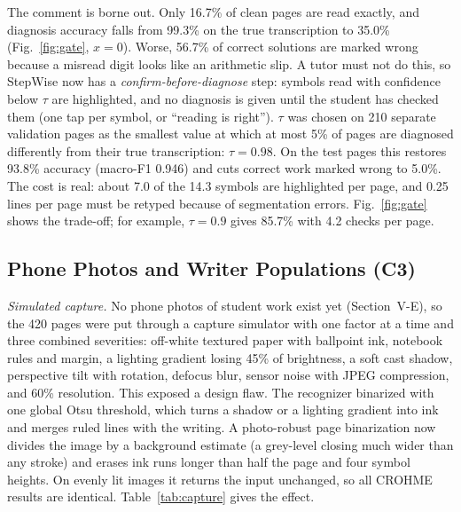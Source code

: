 \documentclass[conference]{IEEEtran}
\begin{document}
The comment is borne out. Only 16.7\% of clean pages are read exactly, and diagnosis accuracy falls from 99.3\% on the true transcription to 35.0\% (Fig.~\ref{fig:gate}, $x=0$). Worse, 56.7\% of correct solutions are marked wrong because a misread digit looks like an arithmetic slip. A tutor must not do this, so StepWise now has a \textit{confirm-before-diagnose} step: symbols read with confidence below $\tau$ are highlighted, and no diagnosis is given until the student has checked them (one tap per symbol, or ``reading is right''). $\tau$ was chosen on 210 separate validation pages as the smallest value at which at most 5\% of pages are diagnosed differently from their true transcription: $\tau=0.98$. On the test pages this restores 93.8\% accuracy (macro-F1 0.946) and cuts correct work marked wrong to 5.0\%. The cost is real: about 7.0 of the 14.3 symbols are highlighted per page, and 0.25 lines per page must be retyped because of segmentation errors. Fig.~\ref{fig:gate} shows the trade-off; for example, $\tau=0.9$ gives 85.7\% with 4.2 checks per page.

\subsection{Phone Photos and Writer Populations (C3)}
\textit{Simulated capture.} No phone photos of student work exist yet (Section~V-E), so the 420 pages were put through a capture simulator with one factor at a time and three combined severities: off-white textured paper with ballpoint ink, notebook rules and margin, a lighting gradient losing 45\% of brightness, a soft cast shadow, perspective tilt with rotation, defocus blur, sensor noise with JPEG compression, and 60\% resolution. This exposed a design flaw. The recognizer binarized with one global Otsu threshold, which turns a shadow or a lighting gradient into ink and merges ruled lines with the writing. A photo-robust page binarization now divides the image by a background estimate (a grey-level closing much wider than any stroke) and erases ink runs longer than half the page and four symbol heights. On evenly lit images it returns the input unchanged, so all CROHME results are identical. Table~\ref{tab:capture} gives the effect.
\end{document}
